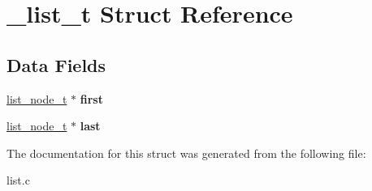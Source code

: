 \hypertarget{struct__list__t}{}\section{\+\_\+list\+\_\+t Struct Reference}
\label{struct__list__t}
\subsection*{Data Fields}
\begin{DoxyCompactItemize}
\item 
\hypertarget{struct__list__t_a64543055715413fed92b2aa85c20df87}{}\hyperlink{struct__list__node__t}{list\+\_\+node\+\_\+t} $\ast$ {\bfseries first}\label{struct__list__t_a64543055715413fed92b2aa85c20df87}

\item 
\hypertarget{struct__list__t_aeb1aebaf3e9a25f4a7edee76f3965324}{}\hyperlink{struct__list__node__t}{list\+\_\+node\+\_\+t} $\ast$ {\bfseries last}\label{struct__list__t_aeb1aebaf3e9a25f4a7edee76f3965324}

\end{DoxyCompactItemize}


The documentation for this struct was generated from the following file\+:\begin{DoxyCompactItemize}
\item 
list.\+c\end{DoxyCompactItemize}
